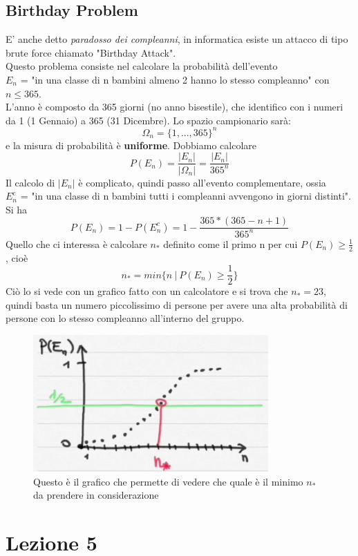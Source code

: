 \documentclass{report}
\begin{document}
\section{Birthday Problem}
E' anche detto \textit{paradosso dei compleanni}, in informatica esiste un attacco di tipo brute force chiamato "Birthday Attack".\\
Questo problema consiste nel calcolare la probabilità dell'evento\\ \(E_n\) = "in una classe di n bambini almeno 2 hanno lo stesso compleanno" con \(n \leq 365\).\\
L'anno è composto da 365 giorni (no anno bisestile), che identifico con i numeri da 1 (1 Gennaio) a 365 (31 Dicembre). Lo spazio campionario sarà: \[\Omega_n = \{1, ..., 365\}^n\] e la misura di probabilità è \textbf{uniforme}. Dobbiamo calcolare \[P(E_n) = \frac{|E_n|}{|\Omega_n|} = \frac{|E_n|}{365^n}\] Il calcolo di \(|E_n|\) è complicato, quindi passo all'evento complementare, ossia\\ \(E_n^{c}\) = "in una classe di n bambini tutti i compleanni avvengono in giorni distinti". Si ha \[P(E_n) = 1 - P(E_n^{c}) = 1 - \frac{365*(365 - n + 1)}{365^n}\] Quello che ci interessa è calcolare \(n_*\) definito come il primo n per cui \(P(E_n) \geq \frac{1}{2}\), cioè \[n_* = min\{n\ |\ P(E_n) \geq \frac{1}{2}\}\] Ciò lo si vede con un grafico fatto con un calcolatore e si trova che \(n_* = 23\), quindi basta un numero piccolissimo di persone per avere una alta probabilità di persone con lo stesso compleanno all'interno del gruppo. \begin{figure}[hb]
    \centering
    \includegraphics[width = 9cm]{GraficoBirthday.png}
    \caption{Questo è il grafico che permette di vedere che quale è il minimo \(n_*\) da prendere in considerazione}
    \label{fig:BirthdayAttack}
\end{figure}
\chapter{Lezione 5}
\end{document}
